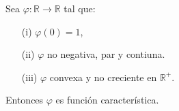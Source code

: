 \begin{teo}
    Sea $\varphi: \mathbb{R} \longrightarrow \mathbb{R}$ tal que:
    \begin{enumerate}
        \item[(i)] $\varphi(0) = 1$,
        \item[(ii)] $\varphi$ no negativa, par y contiuna.
        \item[(iii)] $\varphi$ convexa y no creciente en $\mathbb{R}^+$.
    \end{enumerate}
    Entonces $\varphi$ es función característica.
\end{teo}